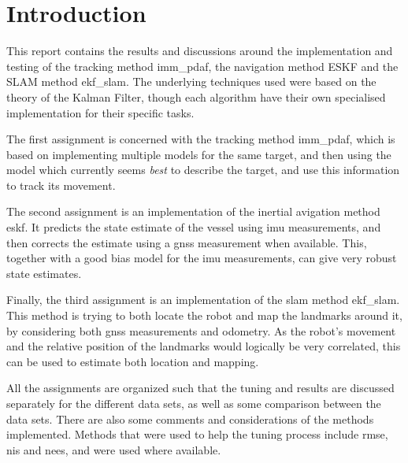 \section{Introduction}\label{sec:intro}
This report contains the results and discussions around the implementation and testing of the tracking method \acrfull{imm_pdaf}, the navigation method ESKF and the SLAM method \acrfull{ekf_slam}. The underlying techniques used were based on the theory of the Kalman Filter, though each algorithm have their own specialised implementation for their specific tasks. 

The first assignment is concerned with the tracking method \acrshort{imm_pdaf}, which is based on implementing multiple models for the same target, and then using the model which currently seems \textit{best} to describe the target, and use this information to track its movement. 

The second assignment is an implementation of the inertial avigation method \acrshort{eskf}. It predicts the state estimate of the vessel using \acrfull{imu} measurements, and then corrects the estimate using a \acrfull{gnss} measurement when available. This, together with a good bias model for the \acrshort{imu} measurements, can give very robust state estimates. 

Finally, the third assignment is an implementation of the \acrshort{slam} method \acrshort{ekf_slam}. This method is trying to both locate the robot and map the landmarks around it, by considering both \acrshort{gnss} measurements and odometry. As the robot's movement and the relative position of the landmarks would logically be very correlated, this can be used to estimate both location and mapping. 

All the assignments are organized such that the tuning and results are discussed separately for the different data sets, as well as some comparison between the data sets. There are also some comments and considerations of the methods implemented. Methods that were used to help the tuning process include \acrfull{rmse}, \acrfull{nis} and \acrfull{nees}, and were used where available.







